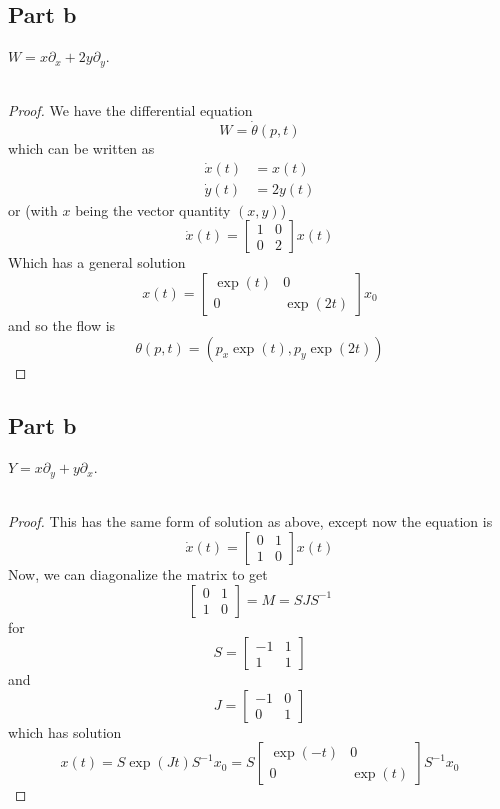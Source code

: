 \documentclass[fontsize=11pt]{scrartcl} %
\numberwithin{equation}{section} %
\numberwithin{figure}{section} %
\numberwithin{table}{section} %
\begin{document}
\subsection*{Part b}
$W=x\partial_x + 2y\partial_y$.
\\
\\
\begin{proof}
    We have the differential equation
    \[
        W = \dot{\theta}(p,t)
    \]
    which can be written as
    \[
        \begin{aligned}
            \dot{x}(t) &= x(t)\\
            \dot{y}(t) &=2y(t)
        \end{aligned}
    \]
    or (with $x$ being the vector quantity $(x,y)$)
    \[
        \dot{x}(t) =
        \begin{bmatrix}
        1&0\\
        0&2
        \end{bmatrix}
        x(t)
    \]
    Which has a general solution
    \[
        x(t) =
        \begin{bmatrix}
        \exp(t)&0\\
            0&\exp(2t)
        \end{bmatrix}
        x_0
    \]
    and so the flow is
    \[
        \theta(p,t) = (p_x\exp(t),p_y\exp(2t))
    \]
\end{proof}

\subsection*{Part b}
$Y=x\partial_y + y\partial_x$.
\\
\\
\begin{proof}
    This has the same form of solution as above, except now the equation is
    \[
        \dot{x}(t) =
        \begin{bmatrix}
        0&1\\
            1&0
        \end{bmatrix}
        x(t)
    \]
    Now, we can diagonalize the matrix to get
    \[
        \begin{bmatrix}
        0&1\\
            1&0
        \end{bmatrix}
        = M = SJS^{-1}
    \]
    for
    \[
        S=
        \begin{bmatrix}
            -1&1\\
            1&1
        \end{bmatrix}
    \]
    and
    \[
        J=
        \begin{bmatrix}
            -1&0\\
            0&1
        \end{bmatrix}
    \]
    which has solution
    \[
        x(t) = S\exp(Jt)S^{-1}x_0
            = S
            \begin{bmatrix}
                \exp(-t)&0\\
                0&\exp(t)
            \end{bmatrix}
            S^{-1}x_0
    \]
\end{proof}
\end{document}
